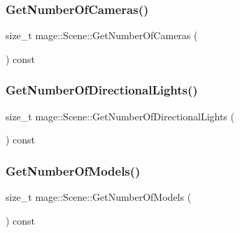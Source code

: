 \hypertarget{classmage_1_1_scene_a7b0a49510128a1e9dbc64a657fe9ec7a}{}\label{classmage_1_1_scene_a7b0a49510128a1e9dbc64a657fe9ec7a} 
\subsubsection{\texorpdfstring{Get\+Number\+Of\+Cameras()}{GetNumberOfCameras()}}
{\footnotesize\ttfamily size\+\_\+t mage\+::\+Scene\+::\+Get\+Number\+Of\+Cameras (\begin{DoxyParamCaption}{ }\end{DoxyParamCaption}) const\hspace{0.3cm}{\ttfamily [noexcept]}}

\hypertarget{classmage_1_1_scene_afd3b87bc2e2212890ff4c7a761c29684}{}\label{classmage_1_1_scene_afd3b87bc2e2212890ff4c7a761c29684} 
\subsubsection{\texorpdfstring{Get\+Number\+Of\+Directional\+Lights()}{GetNumberOfDirectionalLights()}}
{\footnotesize\ttfamily size\+\_\+t mage\+::\+Scene\+::\+Get\+Number\+Of\+Directional\+Lights (\begin{DoxyParamCaption}{ }\end{DoxyParamCaption}) const\hspace{0.3cm}{\ttfamily [noexcept]}}

\hypertarget{classmage_1_1_scene_aa5092da49a901a02802d7f1532b75210}{}\label{classmage_1_1_scene_aa5092da49a901a02802d7f1532b75210} 
\subsubsection{\texorpdfstring{Get\+Number\+Of\+Models()}{GetNumberOfModels()}}
{\footnotesize\ttfamily size\+\_\+t mage\+::\+Scene\+::\+Get\+Number\+Of\+Models (\begin{DoxyParamCaption}{ }\end{DoxyParamCaption}) const\hspace{0.3cm}{\ttfamily [noexcept]}}

